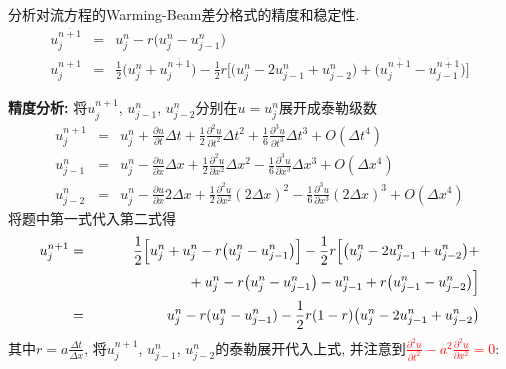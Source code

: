 \begin{problem}[问题4]
分析对流方程的Warming-Beam差分格式的精度和稳定性.
\begin{eqnarray}
u_j^{\overline{n+1}} &=& u_j^n - r\big(u_j^n-u_{j-1}^n\big)\nonumber\\
u_j^{n+1} &=& \frac{1}{2}\big(u_j^n+u_j^{\overline{n+1}} \big)
-\frac{1}{2}r\Big[
\big(u_j^n-2u_{j-1}^n + u_{j-2}^n\big)
+ \big( u_j^{\overline{n+1}} - u_{j-1}^{\overline{n+1}}\big)
\Big]\nonumber
\end{eqnarray}
\end{problem}

\begin{solution}
\textbf{精度分析:} 将$u_{j}^{n+1}$, $u_{j-1}^{n}$, $u_{j-2}^{n}$分别在$u=u_{j}^{n}$展开成泰勒级数
{\setlength\arraycolsep{2pt}
\begin{eqnarray}
u_{j}^{n+1} & = & u_{j}^{n}+\frac{\partial u}{\partial t}\Delta t+\frac{1}{2}\frac{\partial^{2}u}{\partial t^{2}}\Delta t^{2}+\frac{1}{6}\frac{\partial^{3}u}{\partial t^{3}}\Delta t^{3}+O(\Delta t^{4})\label{eq:ujn+1}\\
u_{j-1}^{n} & = & u_{j}^{n}-\frac{\partial u}{\partial x}\Delta x+\frac{1}{2}\frac{\partial^{2}u}{\partial x^{2}}\Delta x^{2}-\frac{1}{6}\frac{\partial^{3}u}{\partial x^{3}}\Delta x^{3}+O(\Delta x^{4})\label{eq:ujn-1}\\
u_{j-2}^{n} & = & u_{j}^{n}-\frac{\partial u}{\partial x}2\Delta x+\frac{1}{2}\frac{\partial^{2}u}{\partial x^{2}}(2\Delta x)^{2}-\frac{1}{6}\frac{\partial^{3}u}{\partial x^{3}}(2\Delta x)^{3}+O(\Delta x^{4})\label{eq:uj-2n}
\end{eqnarray}}
将题中第一式代入第二式得
{\setlength\arraycolsep{2pt}
\begin{eqnarray}
u_{j}^{n+1} & = & \frac{1}{2}\Big[u_{j}^{n}+u_{j}^{n}-r\big(u_{j}^{n}-u_{j-1}^{n}\big)\Big]-\frac{1}{2}r\Big[\big(u_{j}^{n}-2u_{j-1}^{n}+u_{j-2}^{n}\big)+\nonumber\\
 &  & \hphantom{\frac{1}{2}\bigg[u_{j}^{n}+u_{j}^{n}-r}+u_{j}^{n}-r\big(u_{j}^{n}-u_{j-1}^{n}\big)-u_{j-1}^{n}+r\big(u_{j-1}^{n}-u_{j-2}^{n}\big)\Big]\nonumber\\
 & = & u_{j}^{n}-r(u_{j}^{n}-u_{j-1}^{n})-\frac{1}{2}r(1-r)\big(u_{j}^{n}-2u_{j-1}^{n}+u_{j-2}^{n}\big)\label{eq:ujn+1=}
\end{eqnarray}}
其中$r=a\frac{\Delta t}{\Delta x}$, 将$u_{j}^{n+1}$, $u_{j-1}^{n}$,
$u_{j-2}^{n}$的泰勒展开代入上式, 并注意到\textcolor{red}{$\frac{\partial^{2}u}{\partial t^{2}}-a^{2}\frac{\partial^{2}u}{\partial x^{2}}=0$}:
\begin{eqnarray*}

\end{eqnarray*}
\end{solution}
